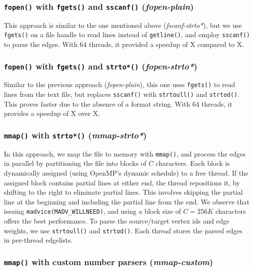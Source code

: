 \subsubsection{\texttt{fopen()} with \texttt{fgets()} and \texttt{sscanf()} (\textit{fopen-plain})}
\label{sec:el-fopen-plain}

This approach is similar to the one mentioned above (\textit{fscanf-strto*}), but we use \texttt{fgets()} on a file handle to read lines instead of \texttt{getline()}, and employ \texttt{sscanf()} to parse the edges. With 64 threads, it provided a speedup of X compared to X.


\subsubsection{\texttt{fopen()} with \texttt{fgets()} and \texttt{strto*()} (\textit{fopen-strto*})}
\label{sec:el-fopen-strto*}

Similar to the previous approach (\textit{fopen-plain}), this one uses \texttt{fgets()} to read lines from the text file, but replaces \texttt{sscanf()} with \texttt{strtoull()} and \texttt{strtod()}. This proves faster due to the absence of a format string. With 64 threads, it provides a speedup of X over X.


\subsubsection{\texttt{mmap()} with \texttt{strto*()} (\textit{mmap-strto*})}
\label{sec:el-mmap-strto*}

In this approach, we map the file to memory with \texttt{mmap()}, and process the edges in parallel by partitioning the file into blocks of $C$ characters. Each block is dynamically assigned (using OpenMP's dynamic schedule) to a free thread. If the assigned block contains partial lines at either end, the thread repositions it, by shifting to the right to eliminate partial lines. This involves skipping the partial line at the beginning and including the partial line from the end. We observe that issuing \texttt{madvice(MADV\_WILLNEED)}, and using a block size of $C=256K$ characters offers the best performance. To parse the source/target vertex ids and edge weights, we use \texttt{strtoull()} and \texttt{strtod()}. Each thread stores the parsed edges in per-thread edgelists.


\subsubsection{\texttt{mmap()} with custom number parsers (\textit{mmap-custom})}
\label{sec:el-mmap-custom}

